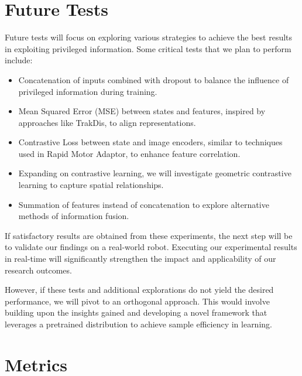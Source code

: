 \documentclass{article}
\begin{document}
\newpage

\section*{Future Tests}
Future tests will focus on exploring various strategies to achieve the best results in exploiting privileged information. Some critical tests that we plan to perform include:
\begin{itemize}
    \item Concatenation of inputs combined with dropout to balance the influence of privileged information during training.
    \item Mean Squared Error (MSE) between states and features, inspired by approaches like TrakDis, to align representations.
    \item Contrastive Loss between state and image encoders, similar to techniques used in Rapid Motor Adaptor, to enhance feature correlation.
    \item Expanding on contrastive learning, we will investigate geometric contrastive learning to capture spatial relationships.
    \item Summation of features instead of concatenation to explore alternative methods of information fusion.
\end{itemize}

If satisfactory results are obtained from these experiments, the next step will be to validate our findings on a real-world robot. Executing our experimental results in real-time will significantly strengthen the impact and applicability of our research outcomes.

However, if these tests and additional explorations do not yield the desired performance, we will pivot to an orthogonal approach. This would involve building upon the insights gained and developing a novel framework that leverages a pretrained distribution to achieve sample efficiency in learning.



\section*{Metrics}
\end{document}
